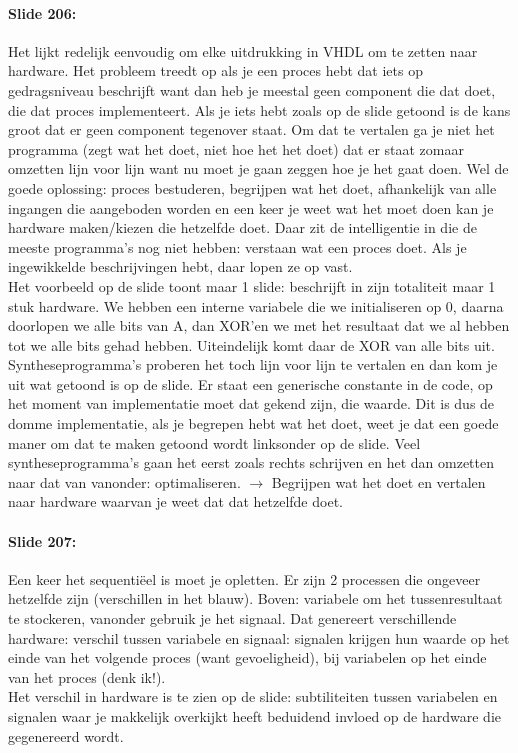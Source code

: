 \documentclass[10pt,a4paper]{book}
\begin{document}
\paragraph{Slide 206:} Het lijkt redelijk eenvoudig om elke uitdrukking in VHDL om te zetten naar hardware. Het probleem treedt op als je een proces hebt dat iets op gedragsniveau beschrijft want dan heb je meestal geen component die dat doet, die dat proces implementeert. Als je iets hebt zoals op de slide getoond is de kans groot dat er geen component tegenover staat. Om dat te vertalen ga je niet het programma (zegt wat het doet, niet hoe het het doet) dat er staat zomaar omzetten lijn voor lijn want nu moet je gaan zeggen hoe je het gaat doen. Wel de goede oplossing: proces bestuderen, begrijpen wat het doet, afhankelijk van alle ingangen die aangeboden worden en een keer je weet wat het moet doen kan je hardware maken/kiezen die hetzelfde doet. Daar zit de intelligentie in die de meeste programma's nog niet hebben: verstaan wat een proces doet. Als je ingewikkelde beschrijvingen hebt, daar lopen ze op vast.\\
Het voorbeeld op de slide toont maar 1 slide: beschrijft in zijn totaliteit maar 1 stuk hardware. We hebben een interne variabele die we initialiseren op 0, daarna doorlopen we alle bits van A, dan XOR'en we met het resultaat dat we al hebben tot we alle bits gehad hebben. Uiteindelijk komt daar de XOR van alle bits uit. Syntheseprogramma's proberen het toch lijn voor lijn te vertalen en dan kom je uit wat getoond is op de slide. Er staat een generische constante in de code, op het moment van implementatie moet dat gekend zijn, die waarde. Dit is dus de domme implementatie, als je begrepen hebt wat het doet, weet je dat een goede maner om dat te maken getoond wordt linksonder op de slide. Veel syntheseprogramma's gaan het eerst zoals rechts schrijven en het dan omzetten naar dat van vanonder: optimaliseren. $\rightarrow$ Begrijpen wat het doet en vertalen naar hardware waarvan je weet dat dat hetzelfde doet.

\paragraph{Slide 207:} Een keer het sequenti\"eel is moet je opletten. Er zijn 2 processen die ongeveer hetzelfde zijn (verschillen in het blauw). Boven: variabele om het tussenresultaat te stockeren, vanonder gebruik je het signaal. Dat genereert verschillende hardware: verschil tussen variabele en signaal: signalen krijgen hun waarde op het einde van het volgende proces (want gevoeligheid), bij variabelen op het einde van het proces (denk ik!).\\
Het verschil in hardware is te zien op de slide: subtiliteiten tussen variabelen en signalen waar je makkelijk overkijkt heeft beduidend invloed op de hardware die gegenereerd wordt.
\end{document}
